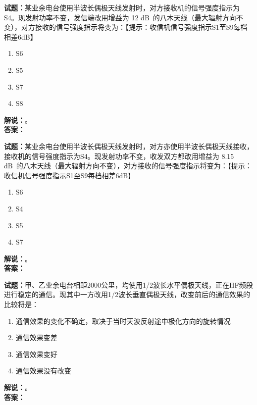 \documentclass{ctexbook}
\begin{document}
\vspace{\baselineskip}

\noindent\textbf{试题：}某业余电台使用半波长偶极天线发射时，对方接收机的信号强度指示为S4。现发射功率不变，发信端改用增益为 12 \unit[qualifier-mode=combine]{\deci\bel{}}的八木天线（最大辐射方向不变），对方接收的信号强度指示将变为：【提示：收信机信号强度指示S1至S9每档相差6dB】
\begin{enumerate}[leftmargin=3em]
  \item S6
  \item S5
  \item S7
  \item S8
\end{enumerate}
\noindent\textbf{解说：}\textbf{}。\\\noindent\textbf{答案：}

\vspace{\baselineskip}

\noindent\textbf{试题：}某业余电台使用半波长偶极天线发射时，对方亦使用半波长偶极天线接收，接收机的信号强度指示为S4。现发射功率不变，收发双方都改用增益为 8.15 \unit[qualifier-mode=combine]{\deci\bel{}}的八木天线（最大辐射方向不变），对方接收的信号强度指示将变为：【提示：收信机信号强度指示S1至S9每档相差6dB】
\begin{enumerate}[leftmargin=3em]
  \item S6
  \item S4
  \item S5
  \item S7
\end{enumerate}
\noindent\textbf{解说：}\textbf{}。\\\noindent\textbf{答案：}

\vspace{\baselineskip}

\noindent\textbf{试题：}甲、乙业余电台相距2000公里，均使用1/2波长水平偶极天线，正在HF频段进行稳定的通信。现其中一方改用1/2波长垂直偶极天线，改变前后的通信效果的比较将是：
\begin{enumerate}[leftmargin=3em]
  \item 通信效果的变化不确定，取决于当时天波反射途中极化方向的旋转情况
  \item 通信效果变差
  \item 通信效果变好
  \item 通信效果没有改变
\end{enumerate}
\noindent\textbf{解说：}\textbf{}。\\\noindent\textbf{答案：}
\end{document}
